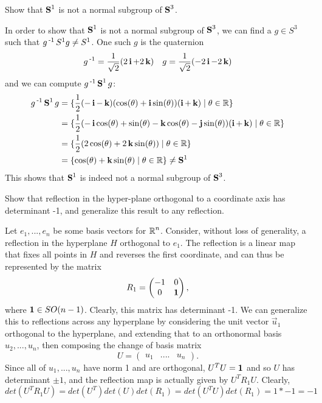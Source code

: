 \documentclass[11pt,onecolumn]{article}
\begin{document}
\begin{exercise}
 Show that $\operatorname{\mathbf{S}}^1$ is not a normal subgroup of $\operatorname{\mathbf{S}}^3$.
\end{exercise}
\begin{answer}

In order to show that $\operatorname{\mathbf{S}}^1$ is not a normal subgroup of $\operatorname{\mathbf{S}}^3$, we can find a $g \in S^3$ such that $g\operatorname{^{-1}} S^1 g \neq S^1$. One such $g$ is the quaternion $$g\operatorname{^{-1}} = \frac{1}{\sqrt{2}}(2\operatorname{\textbf{i}} + 2\operatorname{\textbf{k}}) \quad g = \frac{1}{\sqrt{2}}(-2\operatorname{\textbf{i}} - 2\operatorname{\textbf{k}})$$
and we can compute $g\operatorname{^{-1}} \operatorname{\mathbf{S}}^1 g$:
\begin{align*}
    g\operatorname{^{-1}} \operatorname{\mathbf{S}}^1 g &= \{\frac{1}{2}(-\operatorname{\textbf{i}} -\operatorname{\textbf{k}})(\cos(\theta) + \operatorname{\textbf{i}} \sin(\theta))(\operatorname{\textbf{i}} + \operatorname{\textbf{k}}) \mid \theta \in \operatorname{\mathbb{R}} \} \\
    &= \{
    \frac{1}{2}( -\operatorname{\textbf{i}} \cos(\theta) + \sin(\theta) -\operatorname{\textbf{k}} \cos(\theta) - \operatorname{\textbf{j}} \sin(\theta)  ) (\operatorname{\textbf{i}} + \operatorname{\textbf{k}})
    \mid \theta \in \operatorname{\mathbb{R}} \} \\
    &= \{
    \frac{1}{2}(2\cos(\theta) + 2\operatorname{\textbf{k}} \sin(\theta) )  \mid \theta \in \operatorname{\mathbb{R}}  \} \\
    &= \{\cos(\theta) + \operatorname{\textbf{k}} \sin(\theta) \mid \theta \in \operatorname{\mathbb{R}}
    \}
    \neq \operatorname{\mathbf{S}}^1
\end{align*}
This shows that $\operatorname{\mathbf{S}}^1$ is indeed not a normal subgroup of $\operatorname{\mathbf{S}}^3$.
\end{answer}
\begin{exercise}
Show that reflection in the hyper-plane orthogonal to a coordinate axis has determinant -1, and generalize this result to any reflection.
\end{exercise}
\begin{answer}
Let $e_1,...,e_n$ be some basis vectors for $\operatorname{\mathbb{R}}^n$. Consider, without loss of generality, a reflection in the hyperplane $H$ orthogonal to $e_1$. The reflection is a linear map that fixes all points in $H$ and reverses the first coordinate, and can thus be represented by the matrix
$$R_1 =  \begin{pmatrix} -1 & 0 \\ 0 & \operatorname{\mathbf{1}} \end{pmatrix},$$
where $\operatorname{\mathbf{1}} \in SO(n-1)$. Clearly, this matrix has determinant -1. We can generalize this to reflections across any hyperplane by considering the unit vector $\vec{u}_1$ orthogonal to the hyperplane, and extending that to an orthonormal basis $u_2,...,u_n$, then composing the change of basis matrix
$$ U = \begin{pmatrix} u_1 & .... & u_n \end{pmatrix}. $$ Since all of $u_1,...,u_n$ have norm 1 and are orthogonal, $U^TU = \operatorname{\mathbf{1}}$ and so $U$ has determinant $\pm 1$, and the reflection map is actually given by $U^TR_1U$. Clearly,
$$ det(U^TR_1U) = det(U^T)det(U)det(R_1) = det(U^TU)det(R_1) = 1 * -1 = -1$$

\end{answer}
\end{document}
